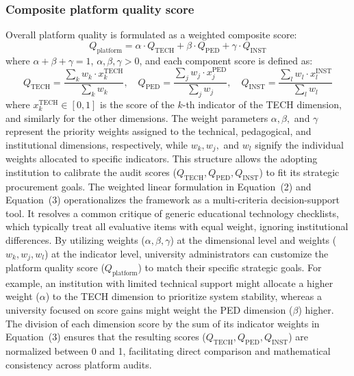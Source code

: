 \documentclass[11pt,a4paper]{article}
\begin{document}
\subsubsection{Composite platform quality score}
Overall platform quality is formulated as a weighted composite score:
\begin{equation}
  Q_{\text{platform}} = \alpha \cdot Q_{\text{TECH}} + \beta \cdot Q_{\text{PED}} + \gamma \cdot Q_{\text{INST}}
\end{equation}
where $\alpha + \beta + \gamma = 1$, $\alpha, \beta, \gamma > 0$, and each component score is defined as:
\begin{equation}
  Q_{\text{TECH}} = \frac{\sum_{k} w_k \cdot x_k^{\text{TECH}}}{\sum_k w_k}, \quad Q_{\text{PED}} = \frac{\sum_{j} w_j \cdot x_j^{\text{PED}}}{\sum_j w_j}, \quad Q_{\text{INST}} = \frac{\sum_{l} w_l \cdot x_l^{\text{INST}}}{\sum_l w_l}
\end{equation}
where $x_k^{\text{TECH}} \in [0,1]$ is the score of the $k$-th indicator of the TECH dimension, and similarly for the other dimensions. The weight parameters $\alpha, \beta,$ and $\gamma$ represent the priority weights assigned to the technical, pedagogical, and institutional dimensions, respectively, while $w_k, w_j,$ and $w_l$ signify the individual weights allocated to specific indicators. This structure allows the adopting institution to calibrate the audit scores ($Q_{\text{TECH}}, Q_{\text{PED}}, Q_{\text{INST}}$) to fit its strategic procurement goals. The weighted linear formulation in Equation~(2) and Equation~(3) operationalizes the framework as a multi-criteria decision-support tool. It resolves a common critique of generic educational technology checklists, which typically treat all evaluative items with equal weight, ignoring institutional differences. By utilizing weights ($\alpha, \beta, \gamma$) at the dimensional level and weights ($w_k, w_j, w_l$) at the indicator level, university administrators can customize the platform quality score ($Q_{\text{platform}}$) to match their specific strategic goals. For example, an institution with limited technical support might allocate a higher weight ($\alpha$) to the TECH dimension to prioritize system stability, whereas a university focused on score gains might weight the PED dimension ($\beta$) higher. The division of each dimension score by the sum of its indicator weights in Equation~(3) ensures that the resulting scores ($Q_{\text{TECH}}, Q_{\text{PED}}, Q_{\text{INST}}$) are normalized between 0 and 1, facilitating direct comparison and mathematical consistency across platform audits.
\end{document}
